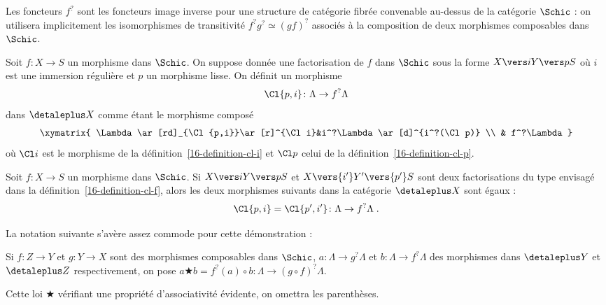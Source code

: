 \documentclass[10pt]{../fichiers-configuration-latex/smfart}
\begin{document}
Les foncteurs $f^?$ sont les foncteurs image inverse pour une structure de
catégorie fibrée convenable au-dessus de la catégorie $\Schic$ : on
utilisera implicitement les isomorphismes de transitivité $f^?g^?\simeq
(gf)^?$ associés à la composition de deux morphismes composables dans
$\Schic$.

\begin{definition2}\label{16-definition-cl-f}
Soit $f\colon X\to S$ un morphisme dans $\Schic$.
On suppose donnée une factorisation de $f$ dans $\Schic$ sous la forme
$X\vers i Y\vers p S$ où $i$ est une immersion régulière et $p$ un
morphisme lisse. On définit un morphisme
\[\Cl {p,i}\colon \Lambda\to f^?\Lambda\]
dans $\detaleplus X$ comme étant le morphisme composé
\[
\xymatrix{
\Lambda\ar[rd]_{\Cl {p,i}}\ar[r]^{\Cl i}&i^?\Lambda\ar[d]^{i^?(\Cl p)} \\
& f^?\Lambda}
\]
où $\Cl i$ est le morphisme de la définition~\ref{16-definition-cl-i}
et $\Cl p$ celui de la définition~\ref{16-definition-cl-p}.
\end{definition2}

\begin{theoreme2}\label{16-theoreme-independance-factorisation}
Soit $f\colon X\to S$ un morphisme dans $\Schic$.
Si $X\vers i Y\vers p S$ et $X\vers {i'}Y'\vers {p'}S$ sont
deux factorisations du type envisagé dans la
définition~\ref{16-definition-cl-f}, alors les deux morphismes suivants
dans la catégorie $\detaleplus X$ sont égaux :
\[\Cl {p,i}=\Cl{p',i'}\colon \Lambda\to f^?\Lambda\;\text{.}\]
\end{theoreme2}

La notation suivante s'avère assez commode pour cette démonstration :

\begin{definition2}
Si $f\colon Z\to Y$ et $g\colon Y\to X$ sont des morphismes composables
dans $\Schic$, $a\colon \Lambda\to g^?\Lambda$ et 
$b\colon \Lambda\to f^?\Lambda$
des morphismes dans $\detaleplus Y$ et $\detaleplus Z$ respectivement, on pose $a\bigstar
b=f^?(a)\circ b\colon \Lambda\to (g\circ f)^?\Lambda$.
\end{definition2}

Cette loi $\bigstar$ vérifiant une propriété d'associativité évidente, on
omettra les parenthèses.
\end{document}
